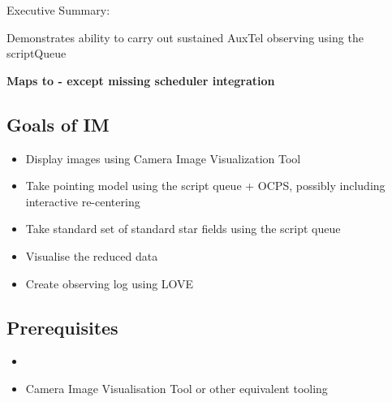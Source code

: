 
Executive Summary:

Demonstrates ability to carry out sustained AuxTel observing using the scriptQueue

\textbf{Maps to  - except missing scheduler integration}

\subsection{Goals of IM}
\label{sec:orgbe41e90}
\begin{itemize}
\item Display images using Camera Image Visualization Tool
\item Take pointing model using the script queue + \gls{OCPS}, possibly including interactive re-centering
\item Take standard set of standard star fields using the script queue
\item Visualise the reduced data
\item Create observing log using \gls{LOVE}
\end{itemize}

\subsection{Prerequisites}

\begin{itemize}
\item{}
\item{Camera Image Visualisation Tool or other equivalent tooling}
\end{itemize}

